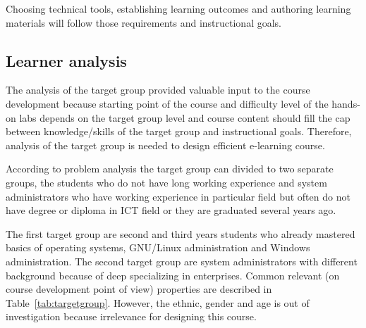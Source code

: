 Choosing technical tools, establishing learning outcomes and authoring learning materials will follow those requirements and instructional goals.

\subsection{Learner analysis}


The analysis of the target group provided valuable input to the course development because starting point of the course and difficulty level of the hands-on labs depends on the target group level and course content should fill the cap between knowledge/skills of the target group and instructional goals. Therefore, analysis of the target group is needed to design efficient e-learning course.

 According to problem analysis the target group can divided to two separate groups, the students who do not have long working experience and system administrators who have working experience in particular field but often do not have degree or diploma in \gls{ICT} field or they are graduated several years ago.

The first target group are second and third years students who already mastered basics of operating systems, GNU/Linux administration and Windows administration. The second target group are system administrators with different background because of deep specializing in enterprises. Common relevant (on course development point of view)  properties are described in Table~\ref{tab:targetgroup}. However, the ethnic, gender and age is out of investigation because irrelevance for designing this course.

